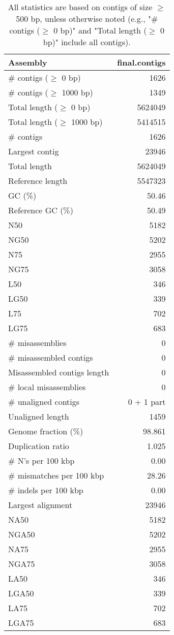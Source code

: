 \documentclass[12pt,a4paper]{article}
\begin{document}
\begin{table}[ht]
\begin{center}
\caption{All statistics are based on contigs of size $\geq$ 500 bp, unless otherwise noted (e.g., "\# contigs ($\geq$ 0 bp)" and "Total length ($\geq$ 0 bp)" include all contigs).}
\begin{tabular}{|l*{1}{|r}|}
\hline
Assembly & final.contigs \\ \hline
\# contigs ($\geq$ 0 bp) & 1626 \\ \hline
\# contigs ($\geq$ 1000 bp) & 1349 \\ \hline
Total length ($\geq$ 0 bp) & 5624049 \\ \hline
Total length ($\geq$ 1000 bp) & 5414515 \\ \hline
\# contigs & 1626 \\ \hline
Largest contig & 23946 \\ \hline
Total length & 5624049 \\ \hline
Reference length & 5547323 \\ \hline
GC (\%) & 50.46 \\ \hline
Reference GC (\%) & 50.49 \\ \hline
N50 & 5182 \\ \hline
NG50 & 5202 \\ \hline
N75 & 2955 \\ \hline
NG75 & 3058 \\ \hline
L50 & 346 \\ \hline
LG50 & 339 \\ \hline
L75 & 702 \\ \hline
LG75 & 683 \\ \hline
\# misassemblies & 0 \\ \hline
\# misassembled contigs & 0 \\ \hline
Misassembled contigs length & 0 \\ \hline
\# local misassemblies & 0 \\ \hline
\# unaligned contigs & 0 + 1 part \\ \hline
Unaligned length & 1459 \\ \hline
Genome fraction (\%) & 98.861 \\ \hline
Duplication ratio & 1.025 \\ \hline
\# N's per 100 kbp & 0.00 \\ \hline
\# mismatches per 100 kbp & 28.26 \\ \hline
\# indels per 100 kbp & 0.00 \\ \hline
Largest alignment & 23946 \\ \hline
NA50 & 5182 \\ \hline
NGA50 & 5202 \\ \hline
NA75 & 2955 \\ \hline
NGA75 & 3058 \\ \hline
LA50 & 346 \\ \hline
LGA50 & 339 \\ \hline
LA75 & 702 \\ \hline
LGA75 & 683 \\ \hline
\end{tabular}
\end{center}
\end{table}
\end{document}
